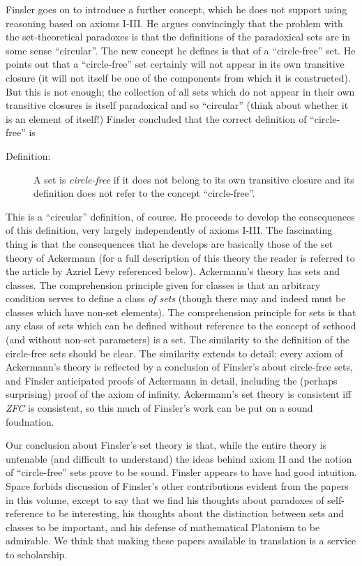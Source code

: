Finsler goes on to introduce a further concept, which he does not
support using reasoning based on axioms I-III.  He argues convincingly
that the problem with the set-theoretical paradoxes is that the
definitions of the paradoxical sets are in some sense ``circular''.
The new concept he defines is that of a ``circle-free'' set.  He
points out that a ``circle-free'' set certainly will not appear in its
own transitive closure (it will not itself be one of the components
from which it is constructed).  But this is not enough; the collection
of all sets which do not appear in their own transitive closures is
itself paradoxical and so ``circular'' (think about whether it is an
element of itself!)  Finsler concluded that the correct definition of
``circle-free'' is

\begin{description}

\item[Definition:]  A set is {\em circle-free\/} if it does not belong to its own transitive closure and its definition does not refer to the concept ``circle-free''.

\end{description}

This is a ``circular'' definition, of course.  He proceeds to develop
the consequences of this definition, very largely independently of
axioms I-III.  The fascinating thing is that the consequences that he
develops are basically those of the set theory of Ackermann (for a
full description of this theory the reader is referred to the article
by Azriel Levy referenced below).  Ackermann's theory has sets and
classes.  The comprehension principle given for classes is that an
arbitrary condition serves to define a class {\em of sets\/} (though
there may and indeed must be classes which have non-set elements).
The comprehension principle for sets is that any class of sets which
can be defined without reference to the concept of sethood (and
without non-set parameters) is a set.  The similarity to the
definition of the circle-free sets should be clear.  The similarity
extends to detail; every axiom of Ackermann's theory is reflected by a
conclusion of Finsler's about circle-free sets, and Finsler
anticipated proofs of Ackermann in detail, including the (perhaps
surprising) proof of the axiom of infinity.  Ackermann's set theory is
consistent iff {\em ZFC\/} is consistent, so this much of Finsler's
work can be put on a sound foudnation.

Our conclusion about Finsler's set theory is that, while the entire
theory is untenable (and difficult to understand) the ideas behind
axiom II and the notion of ``circle-free'' sets prove to be sound.
Finsler appears to have had good intuition.  Space forbids discussion
of Finsler's other contributions evident from the papers in this
volume, except to say that we find his thoughts about paradoxes of
self-reference to be interesting, his thoughts about the distinction
between sets and classes to be important, and his defense of
mathematical Platonism to be admirable.  We think that making these
papers available in translation is a service to scholarship.

